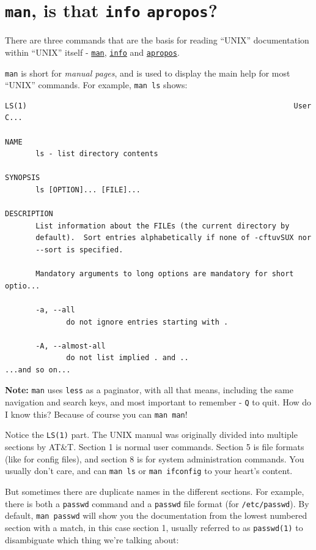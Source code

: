 \documentclass[10pt,]{book}
\numberwithin{figure}{chapter}
\begin{document}
\section{\texttt{man}, is that \texttt{info}
\texttt{apropos}?}\label{man-is-that-info-apropos}

There are three commands that are the basis for reading ``UNIX''
documentation within ``UNIX'' itself -
\href{http://linux.die.net/man/1/man}{\texttt{man}},
\href{http://linux.die.net/man/1/info}{\texttt{info}} and
\href{http://linux.die.net/man/1/apropos}{\texttt{apropos}}.

\texttt{man} is short for \emph{manual pages}, and is used to display
the main help for most ``UNIX'' commands. For example, \texttt{man ls}
shows:

\begin{verbatim}
LS(1)                                                             User C...

NAME
       ls - list directory contents

SYNOPSIS
       ls [OPTION]... [FILE]...

DESCRIPTION
       List information about the FILEs (the current directory by
       default).  Sort entries alphabetically if none of -cftuvSUX nor
       --sort is specified.

       Mandatory arguments to long options are mandatory for short optio...

       -a, --all
              do not ignore entries starting with .

       -A, --almost-all
              do not list implied . and ..
...and so on...
\end{verbatim}

\textbf{Note:} \texttt{man} uses \texttt{less} as a paginator, with all
that means, including the same navigation and search keys, and most
important to remember - \texttt{Q} to quit. How do I know this? Because
of course you can \texttt{man man}!

Notice the \texttt{LS(1)} part. The UNIX manual was originally divided
into multiple sections by AT\&T. Section 1 is normal user commands.
Section 5 is file formats (like for config files), and section 8 is for
system administration commands. You usually don't care, and can
\texttt{man ls} or \texttt{man ifconfig} to your heart's content.

But sometimes there are duplicate names in the different sections. For
example, there is both a \texttt{passwd} command and a \texttt{passwd}
file format (for \texttt{/etc/passwd}). By default, \texttt{man passwd}
will show you the documentation from the lowest numbered section with a
match, in this case section 1, usually referred to as \texttt{passwd(1)}
to disambiguate which thing we're talking about:
\end{document}
